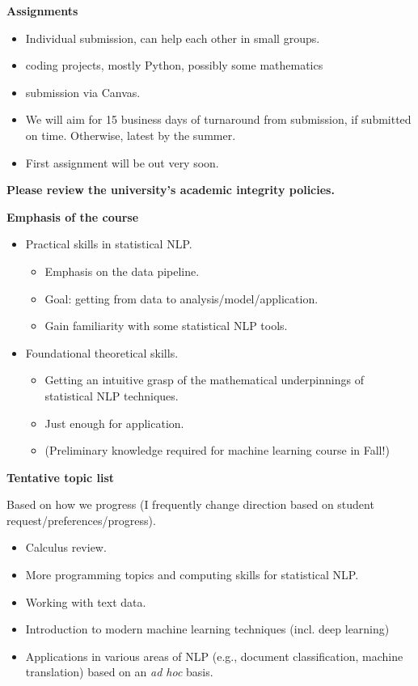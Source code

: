 \documentclass{beamer}
\newcommand{\placard}[1]{
  \begin{frame}
    \begin{center}
      \huge
      \textbf{#1}
    \end{center}
  \end{frame}
}
\newcommand{\pagestepalt}[2]{
  \begin{frame}[t]
    \begin{minipage}[t][0.26\textheight][t]{\textwidth}
      \begin{center}
        \huge
        \textbf{#1}
      \end{center}
    \end{minipage}
    
    \begin{minipage}[t][0.7\textheight][c]{\textwidth}
      #2
    \end{minipage}
  \end{frame}
}
\begin{document}
\pagestepalt{Assignments}{
  \begin{itemize}
  \item Individual submission, can help each other in small groups.
  \item coding projects, \alert{mostly} Python, possibly some mathematics
  \item submission via Canvas.
  \item We will aim for 15 business days of turnaround from submission, if submitted on time.  Otherwise, latest by the summer.
  \item First assignment will be out very soon.
  \end{itemize}
}

\placard{Please review the university's academic integrity policies.}

\pagestepalt{Emphasis of the course}{
  \begin{itemize}
  \item Practical skills in statistical NLP.
    \begin{itemize}
    \item Emphasis on the data pipeline.
    \item Goal: getting from data to analysis/model/application.
    \item Gain familiarity with some statistical NLP tools.
    \end{itemize}
  \item Foundational theoretical skills.
    \begin{itemize}
    \item Getting an intuitive grasp of the mathematical underpinnings of statistical NLP techniques.
    \item Just enough for application.
    \item (Preliminary knowledge required for machine learning course in Fall!)
    \end{itemize}
  \end{itemize}
}

\pagestepalt{Tentative topic list}{
  Based on how we progress (I frequently change direction based on student request/preferences/progress).
  \begin{itemize}
  \item Calculus review.
  \item More programming topics and computing skills for statistical NLP.
  \item Working with text data.
  \item Introduction to modern machine learning techniques (incl. deep learning)
  \item Applications in various areas of NLP (e.g., document classification,
    machine translation) based on an {\it ad hoc} basis.
  \end{itemize}
}
\end{document}
